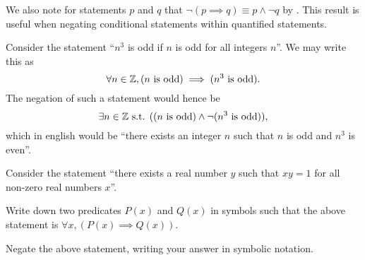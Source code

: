 We also note for statements $p$ and $q$ that $\lnot(p \implies q) \equiv p \land \lnot q$ by . This result is useful when negating conditional statements within quantified statements.

\begin{example}
    Consider the statement ``$n^3$ is odd if $n$ is odd for all integers $n$''. We may write this as
    \[
        \forall n \in \mathbb{Z}, (n \text{ is odd}) \implies (n^3 \text{ is odd}).
    \]
    The negation of such a statement would hence be
    \[
        \exists n \in \mathbb{Z} \text{ s.t. }((n \text{ is odd}) \land \lnot(n^3 \text{ is odd})),
    \]
    which in english would be ``there exists an integer $n$ such that $n$ is odd and $n^3$ is even''.
\end{example}

\begin{exercise}
    Consider the statement ``there exists a real number $y$ such that $xy = 1$ for all non-zero real numbers $x$''.
    \begin{partquestions}{\roman*}
        \item Write down two predicates $P(x)$ and $Q(x)$ in symbols such that the above statement is $\forall x,(P(x) \implies Q(x))$.
        \item Negate the above statement, writing your answer in symbolic notation.
    \end{partquestions}
\end{exercise}

